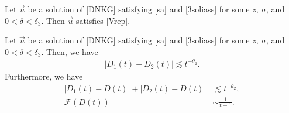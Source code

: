 \documentclass[10pt,a4paper]{amsart}
\begin{document}
\begin{lemma}\label{3solirep}
Let $\vec{u}$ be a solution of \eqref{DNKG} satisfying \eqref{sa} and \eqref{3soliass} for some $z,\ \sigma$, and $0<\delta<\delta_3$. Then $\vec{u}$ satisfies \eqref{Vrep}.
\end{lemma}

\begin{lemma}\label{Dnosalem}
Let $\vec{u}$ be a solution of \eqref{DNKG} satisfying \eqref{sa} and \eqref{3soliass} for some $z,\ \sigma$, and $0<\delta<\delta_3$. Then, we have
\begin{align}\label{Dnosaes}
\left|D_1(t)-D_2(t)\right|\lesssim t^{-\theta_2}.
\end{align}
Furthermore, we have 
\begin{align}
|D_1(t)-D(t)|+|D_2(t)-D(t)|&\lesssim t^{-\theta_2},\label{Dnosaes2}
\\
\mathcal{F}(D(t))&\sim \frac{1}{t+1}.\label{logtorder}
\end{align}
\end{lemma}
\end{document}
